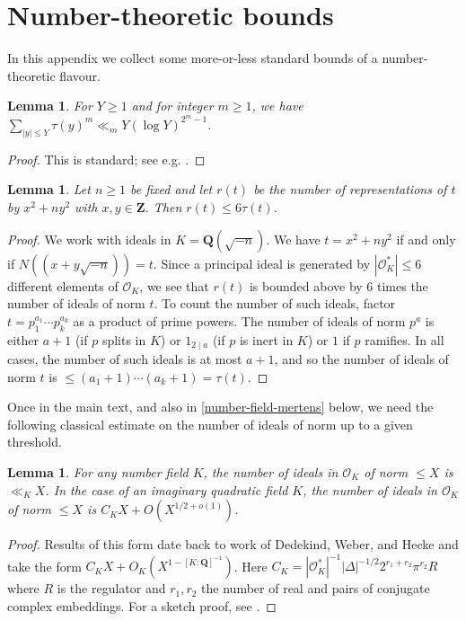 \documentclass[11pt,reqno]{amsart}
\numberwithin{equation}{section}
\newtheorem{lemma}[theorem]{Lemma}
\theoremstyle{definition}
\theoremstyle{remark}
\renewcommand{\le}{\leqslant}
\renewcommand{\ge}{\geqslant}
\newcommand\Z{\mathbf{Z}}
\newcommand\Q{\mathbf{Q}}
\renewcommand\O{\mathcal{O}}
\begin{document}
\section{Number-theoretic bounds}\label{appendixD}

In this appendix we collect some more-or-less standard bounds of a number-theoretic flavour.

\begin{lemma}\label{lem:divisor-moment}
For $Y \ge 1$ and for integer $m \ge 1$, we have $\sum_{|y| \le Y} \tau(y)^{m} \ll_{m} Y (\log Y)^{2^m-1}$.
\end{lemma}
\begin{proof}
This is standard; see e.g. \cite[Equation~(1.80)]{IK-book}. 
\end{proof}

\begin{lemma}\label{repdivisor}
Let $n \ge 1$ be fixed and let $r(t)$ be the number of representations of $t$ by $x^2 + ny^2$ with $x, y \in \Z$. Then $r(t) \le 6\tau(t)$.
\end{lemma}
\begin{proof} We work with ideals in $K = \Q(\sqrt{-n})$. We have $t = x^2 + ny^2$ if and only if $N((x + y\sqrt{-n})) = t$. Since a principal ideal is generated by $|\O^*_K| \le 6$ different elements of $\O_K$, we see that $r(t)$ is bounded above by $6$ times the number of ideals of norm $t$. To count the number of such ideals, factor $t = p_1^{a_1} \cdots p_k^{a_k}$ as a product of prime powers. The number of ideals of norm $p^a$ is either $a+1$ (if $p$ splits in $K$) or $1_{2 \mid a}$ (if $p$ is inert in $K$) or $1$ if $p$ ramifies. In all cases, the number of such ideals is at most $a+1$, and so the number of ideals of norm $t$ is $\le (a_1 + 1) \cdots (a_k + 1) = \tau(t)$.
\end{proof}

Once in the main text, and also in \cref{number-field-mertens} below, we need the following classical estimate on the number of ideals of norm up to a given threshold.
\begin{lemma}\label{num-ideals-lem}
For any number field $K$, the number of ideals in $\O_K$ of norm $\le X$ is $\ll_K X$. In the case of an imaginary quadratic field $K$, the number of ideals in $\O_K$ of norm $\le X$ is $C_K X + O(X^{1/2 + o(1)})$.
\end{lemma}
\begin{proof}
Results of this form date back to work of Dedekind, Weber, and Hecke and take the form $C_K X + O_K(X^{1 - [K:\Q]^{-1}})$. Here $C_K=|\O^*_K|^{-1} |\Delta|^{-1/2}2^{r_1 + r_2} \pi^{r_2} R$ where $R$ is the regulator and $r_1, r_2$ the number of real and pairs of conjugate complex embeddings. For a sketch proof, see \cite[Theorem~1]{heilbronn}. 
\end{proof}
\end{document}
